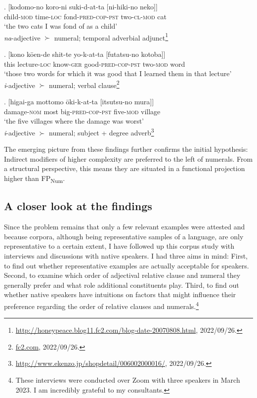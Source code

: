 \exg. [kodomo-no koro-ni suki-d-at-ta [ni-hiki-no neko]]\\ %
child-\textsc{mod} time-\textsc{loc} fond-\textsc{pred-cop-pst} two-\textsc{cl-mod} cat\\
`the two cats I was fond of as a child' \\ \null \hfill \textit{na}-adjective $\succ$ numeral; temporal adverbial adjunct\footnote{\url{http://honeypeace.blog11.fc2.com/blog-date-20070808.html}, 2022/09/26.}

\exg. [kono kōen-de shit-te yo-k-at-ta [futatsu-no kotoba]] \\
this lecture-\textsc{loc} know-\textsc{ger} good-\textsc{pred-cop-pst} two-\textsc{mod} word\\
`those two words for which it was good that I learned them in that lecture' \\ \null \hfill \textit{i}-adjective $\succ$ numeral; verbal clause\footnote{\url{fc2.com}, 2022/09/26.}

\exg. [higai-ga mottomo ōki-k-at-ta [itsutsu-no mura]] \\ %
damage-\textsc{nom} most big-\textsc{pred-cop-pst} five-\textsc{mod} village\\
`the five villages where the damage was worst' \\ \null \hfill \textit{i}-adjective $\succ$ numeral; subject + degree adverb\footnote{\url{http://www.ekenzo.jp/shopdetail/006002000016/}, 2022/09/26.}

The emerging picture from these findings further confirms the initial hypothesis: Indirect modifiers of higher complexity are preferred to the left of numerals. From a structural perspective, this means they are situated in a functional projection higher than FP\textsubscript{Num}.

\subsection{A closer look at the findings} \label{section closer look}
\largerpage[2]
Since the problem remains that only a few relevant examples were attested and because corpora, although being representative samples of a language, are only representative to a certain extent, I have followed up this corpus study with interviews and discussions with native speakers. I had three aims in mind: First, to find out whether representative examples are actually acceptable for speakers. Second, to examine which order of adjectival relative clause and numeral they generally prefer and what role additional constituents play. Third, to find out whether native speakers have intuitions on factors that might influence their preference regarding the order of relative clauses and numerals.\footnote{These interviews were conducted over Zoom with three speakers in March 2023. I am incredibly grateful to my consultants.} 

